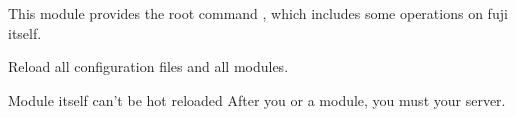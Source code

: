 
This module provides the root command , which includes some operations on fuji itself.

Reload all configuration files and all modules.

\begin{note}{Module itself can't be hot reloaded}
    After you  or  a module, you must  your server.
\end{note}


